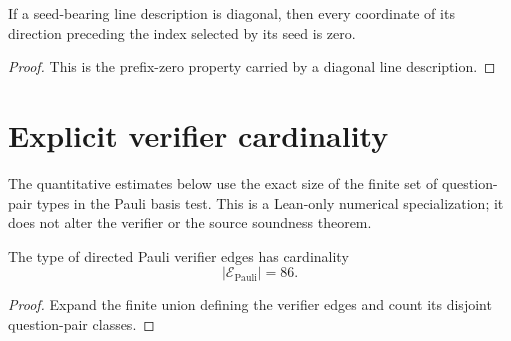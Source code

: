 \begin{lemma}
	\label{lem:line-description-prefix}
	\leanok
	If a seed-bearing line description is diagonal, then every coordinate of its
	direction preceding the index selected by its seed is zero.
\end{lemma}
\begin{proof}
	\leanok
	This is the prefix-zero property carried by a diagonal line description.
\end{proof}

\section{Explicit verifier cardinality}

The quantitative estimates below use the exact size of the finite set of
question-pair types in the Pauli basis test.  This is a Lean-only numerical
specialization; it does not alter the verifier or the source soundness theorem.

\begin{lemma}
\label{lem:pauli-edge-card-explicit}
\leanok
{}
The type of directed Pauli verifier edges has cardinality
\[
  \lvert \mathcal E_{\mathrm{Pauli}}\rvert=86.
\]
\end{lemma}
\begin{proof}
\leanok
Expand the finite union defining the verifier edges and count its disjoint
question-pair classes.
\end{proof}
